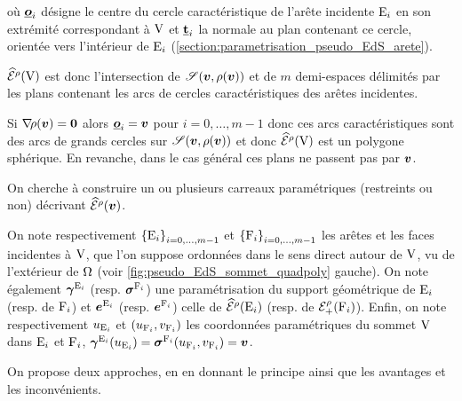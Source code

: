 où $\underline{\bm{o}}_i$ désigne le centre du cercle caractéristique de l'arête incidente $\mathrm{E}_i$ en son extrémité correspondant à $\mathrm{V}$ et $\underline{\mathbf{t}}_i$ la normale au plan contenant ce cercle, orientée vers l'intérieur de $\mathrm{E}_i$ (\cf \autoref{section:parametrisation_pseudo_EdS_arete}).
\par
$\pseudoEdS{\brepvertex}{\rho}$ est donc l'intersection de $\sphere[\v][\rho(\v)]$ et de $m$ demi-espaces délimités par les plans contenant les arcs de cercles caractéristiques des arêtes incidentes.
\par
Si $\nabla \! {\rho}(\bm{v}) = \bm{0}$ alors $\underline{\bm{o}}_i = \bm{v}$  pour $i = 0, \ldots, m-1$ donc ces arcs caractéristiques sont des arcs de grands cercles sur $\sphere[\v][\rho(\v)]$ et donc $\pseudoEdS{\brepvertex}{\rho}$ est un polygone sphérique. 
En revanche, dans le cas général ces plans ne passent pas par $\bm{v}$.
\par
On cherche à construire un ou plusieurs carreaux paramétriques (restreints ou non) décrivant $\pseudoEdS{\v}{\rho}$.
\par
On note respectivement $\left\{{\mathrm{E}}_{i}\right\}_{{i}={0},\ldots,{m-1}}$ et $\left\{{\mathrm{F}}_{i}\right\}_{{i}={0},\ldots,{m-1}}$ les arêtes et les faces incidentes à $\mathrm{V}$, que l'on suppose ordonnées dans le sens direct autour de $\mathrm{V}$, vu de l'extérieur de $\Omega$ (voir \autoref{fig:pseudo_EdS_sommet_quadpoly} gauche). 
On note également $\bm{\gamma}^{\mathrm{E}_i}$ (resp. $\bm{\sigma}^{\mathrm{F}_i}$) une paramétrisation du support géométrique de $\mathrm{E}_i$ (resp. de $\mathrm{F}_i$) et $\bm{e}^{\mathrm{E}_i}$ (resp. $\bm{e}^{\mathrm{F}_i}$) celle de $\pseudoEdS{\brepedge_i}{\rho}$ (resp. de ${\mathcal{E}}_{+}^{\rho}({\mathrm{F}_i})$).
Enfin, on note respectivement $u_{\mathrm{E}_i}$ et $(u_{\mathrm{F}_i}, v_{\mathrm{F}_i})$ les coordonnées paramétriques du sommet $\mathrm{V}$ dans $\mathrm{E}_i$ et $\mathrm{F}_i$, \ie $\bm{\gamma}^{\mathrm{E}_i}(u_{\mathrm{E}_i}) = \bm{\sigma}^{\mathrm{F}_i}(u_{\mathrm{F}_i}, v_{\mathrm{F}_i}) = \bm{v}$.
\par
On propose deux approches, en en donnant le principe ainsi que les avantages et les inconvénients.

